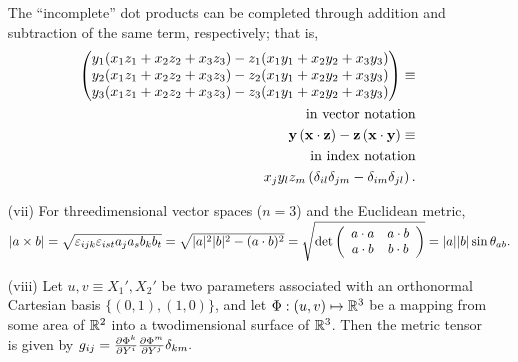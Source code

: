\begin{itemize}
{The ``incomplete''  dot products can be completed through addition and subtraction of the same term, respectively; that is,
\begin{equation}
\begin{split}
\begin{pmatrix}
y_1(x_1z_1 + x_2z_2 + x_3z_3) - z_1(x_1y_1 + x_2y_2 + x_3y_3)   \\
y_2(x_1z_1 + x_2z_2 + x_3z_3) - z_2(x_1y_1 + x_2y_2 + x_3y_3)     \\
y_3(x_1z_1 + x_2z_2 + x_3z_3) - z_3(x_1y_1 + x_2y_2 + x_3y_3)       \\
\end{pmatrix}
\equiv   \\
\textrm{in vector notation}\\
{\bf y} \left( {\bf x} \cdot {\bf z}\right)
-
{\bf z} \left( {\bf x} \cdot {\bf y}\right)
\equiv   \\
\textrm{in index notation}\\
x_j y_l z_m \left(\delta_{il}\delta_{jm}-\delta_{im}\delta_{jl}\right).
\end{split}
\end{equation}
\eproof
}

\item[(vii)]
For threedimensional vector spaces ($n=3$) and the Euclidean metric,\\
$\vert a\times b \vert=
\sqrt{\varepsilon_{ijk}\varepsilon_{ist}a_ja_sb_kb_t}  =
\sqrt{\vert a\vert^2
\vert b\vert^2
-(a\cdot b)^2}=\sqrt{{\rm det}
\left(
\begin{array}{cc}
a\cdot a&a\cdot b\\
a\cdot b&b\cdot b
\end{array}\right)}= \vert a\vert
\vert b\vert \sin \theta_{ab}.$
\item[(viii)]
Let $u,v\equiv X_1',X_2'$ be two parameters associated with an
orthonormal Cartesian basis $\{(0,1),(1,0)\}$, and let
$\Phi :(u,v)\mapsto {\Bbb R}^3$
be a mapping from some area of ${\Bbb R}^2$ into a twodimensional
surface of ${\Bbb R}^3$. Then the metric tensor is given by
$g_{ij}=
{\partial \Phi^k \over \partial  Y ^i}
{\partial \Phi^m \over \partial  Y ^j} \delta_{km}.$

\end{itemize}






